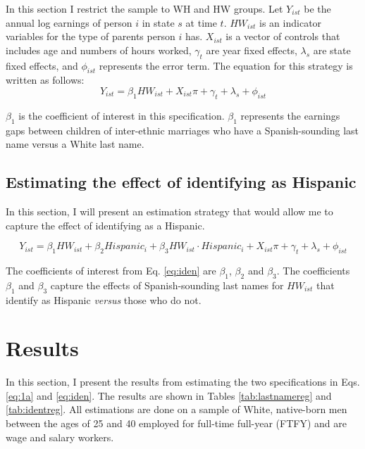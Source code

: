 \documentclass[a4paper,fleqn]{cas-sc}
\begin{document}
In this section I restrict the sample to WH and HW groups. Let $Y_{ist}$ be the annual log earnings of person $i$ in state $s$ at time $t$. $HW_{ist}$ is an indicator variables for the type of parents person $i$ has. $X_{ist}$ is a vector of controls that includes age and numbers of hours worked, $\gamma_{t}$ are year fixed effects, $\lambda_{s}$ are state fixed effects, and $\phi_{ist}$ represents the error term. The equation for this strategy is written as follows:
\begin{equation} \label{eq:1a}
Y_{ist} = \beta_{1} HW_{ist} + X_{ist} \pi + \gamma_{t} + \lambda_s + \phi_{ist}
\end{equation}

$\beta_{1}$ is the coefficient of interest in this specification. $\beta_{1}$ represents the earnings gaps between children of inter-ethnic marriages who have a Spanish-sounding last name versus a White last name.

\subsection{Estimating the effect of identifying as Hispanic}

In this section, I will present an estimation strategy that would allow me to capture the effect of identifying as a Hispanic.

\begin{equation} \label{eq:iden}
Y_{ist} = \beta_{1} HW_{ist} + \beta_{2} Hispanic_i + \beta_{3} HW_{ist} \cdot Hispanic_i + X_{ist} \pi + \gamma_{t} + \lambda_s + \phi_{ist}
\end{equation}

The coefficients of interest from Eq. \eqref{eq:iden} are $\beta_{1}$, $\beta_{2}$ and $\beta_{3}$. The coefficients $\beta_{1}$ and $\beta_{3}$ capture the effects of Spanish-sounding last names for $HW_{ist}$ that identify as Hispanic \textit{versus} those who do not.

\section{Results}\label{sec:results}

In this section, I present the results from estimating the two specifications in Eqs. \eqref{eq:1a} and \eqref{eq:iden}. The results are shown in Tables \ref{tab:lastnamereg} and \ref{tab:identreg}. All estimations are done on a sample of White, native-born men between the ages of 25 and 40 employed for full-time full-year (FTFY) and are wage and salary workers.
\end{document}
